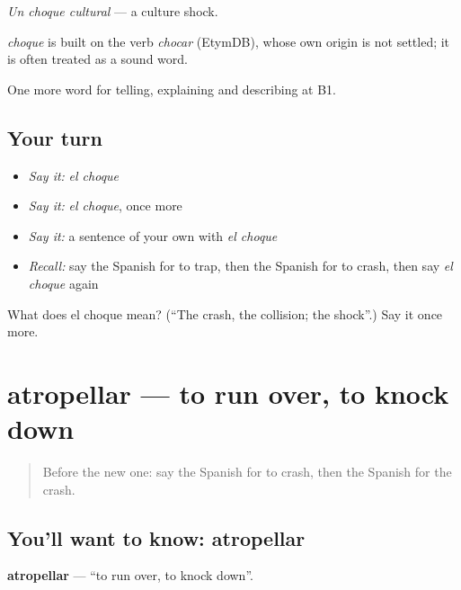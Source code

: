 \emph{Un choque cultural} — a culture shock.

\begin{cousinweb}
\emph{choque} is built on the verb \emph{chocar} (EtymDB), whose own origin is not settled; it is often treated as a sound word.
\end{cousinweb}

\begin{grammarlens}[title={What you've built}]
One more word for telling, explaining and describing at B1.
\end{grammarlens}

\subsection*{Your turn}
\begin{itemize}
\raggedright
  \item \emph{Say it:} \emph{el choque}
  \item \emph{Say it:} \emph{el choque}, once more
  \item \emph{Say it:} a sentence of your own with \emph{el choque}
  \item \emph{Recall:} say the Spanish for to trap, then the Spanish for to crash, then say \emph{el choque} again
\end{itemize}

\begin{tcolorbox}[breakable,colback=teal!4,colframe=teal!35!black,title={Before you move on}]
What does el choque mean? (\textquotedblleft{}The crash, the collision; the shock\textquotedblright{}.) Say it once more.
\end{tcolorbox}
\section[atropellar]{atropellar — to run over, to knock down}

\label{lesson:ES-C527-atropellar}



\begin{quote}
Before the new one: say the Spanish for to crash, then the Spanish for the crash.
\end{quote}

\subsection*{You'll want to know: atropellar}
\textbf{atropellar} — \textquotedblleft{}to run over, to knock down\textquotedblright{}.

